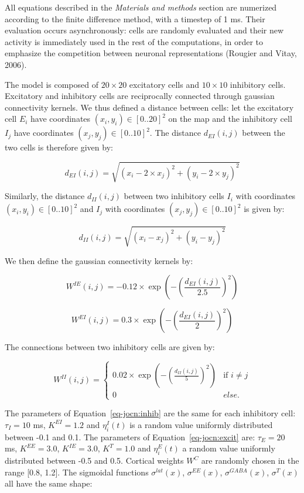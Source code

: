 \documentclass[
  11pt,
  a4paper,
]{scrbook}
\begin{document}

All equations described in the \emph{Materials and methods} section are
numerized according to the finite difference method, with a timestep of
1 ms. Their evaluation occurs asynchronously: cells are randomly
evaluated and their new activity is immediately used in the rest of the
computations, in order to emphasize the competition between neuronal
representations (Rougier and Vitay, 2006).

The model is composed of \(20 \times 20\) excitatory cells and
\(10 \times 10\) inhibitory cells. Excitatory and inhibitory cells are
reciprocally connected through gaussian connectivity kernels. We thus
defined a distance between cells: let the excitatory cell \(E_i\) have
coordinates \((x_i, y_i) \in [0..20]^2\) on the map and the inhibitory
cell \(I_j\) have coordinates \((x_j, y_j) \in [0..10]^2\). The distance
\(d_{EI}(i, j)\) between the two cells is therefore given by:

\[
    d_{EI}(i, j) = \sqrt{(x_i - 2\times x_j)^2 + (y_i - 2\times y_j)^2}
\]

Similarly, the distance \(d_{II}(i, j)\) between two inhibitory cells
\(I_i\) with coordinates \((x_i, y_i) \in [0..10]^2\) and \(I_j\) with
coordinates \((x_j, y_j) \in [0..10]^2\) is given by:

\[
    d_{II}(i, j) = \sqrt{(x_i - x_j)^2 + (y_i - y_j)^2}
\]

We then define the gaussian connectivity kernels by:

\[
    W^{IE}(i, j) = -0.12 \times \exp{ \left(- (\frac{d_{EI}(i, j)}{2.5})^2 \right)}
\]

\[
    W^{EI}(i, j) = 0.3 \times \exp{ \left( - (\frac{d_{EI}(i, j)}{2})^2 \right)}
\]

The connections between two inhibitory cells are given by:

\[W^{II}(i, j) =
     \begin{cases}
     0.02 \times \exp{ \left(- (\frac{d_{II}(i, j)}{5})^2 \right)} & \text{if } i \neq j \\
     0 & else.
     \end{cases}
\]

The parameters of Equation~\ref{eq-jocn:inhib} are the same for each
inhibitory cell: \(\tau_I = 10\) ms, \(K^{EI} = 1.2\) and
\(\eta^I_i (t)\) is a random value uniformly distributed between -0.1
and 0.1. The parameters of Equation~\ref{eq-jocn:excit} are:
\(\tau_E = 20\) ms, \(K^{EE} = 3.0\), \(K^{IE} = 3.0\), \(K^{T} = 1.0\)
and \(\eta^E_i (t)\) a random value uniformly distributed between -0.5
and 0.5. Cortical weights \(W^C\) are randomly chosen in the range
{[}0.8, 1.2{]}. The sigmoidal functions \(\sigma^{lat}(x)\),
\(\sigma^{EE}(x)\), \(\sigma^{GABA}(x)\), \(\sigma^{T}(x)\) all have the
same shape:
\end{document}
